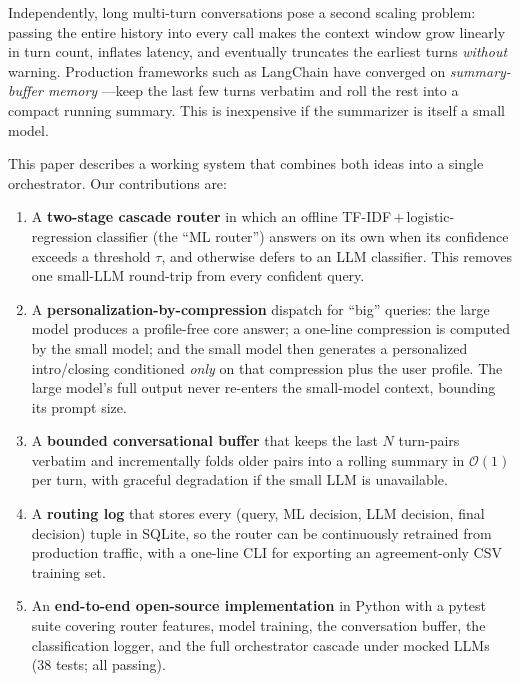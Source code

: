 \documentclass{article}
\begin{document}
Independently, long multi-turn conversations pose a second scaling problem:
passing the entire history into every call makes the context window grow
linearly in turn count, inflates latency, and eventually truncates the
earliest turns \emph{without} warning. Production frameworks such as
LangChain have converged on \emph{summary-buffer memory}
\citep{langchain_memory_2023}---keep the last few turns verbatim and roll the
rest into a compact running summary. This is inexpensive if the summarizer is
itself a small model.

This paper describes a working system that combines both ideas into a single
orchestrator. Our contributions are:

\begin{enumerate}
    \item A \textbf{two-stage cascade router} in which an offline
    TF-IDF\,$+$\,logistic-regression classifier (the ``ML router'') answers on
    its own when its confidence exceeds a threshold $\tau$, and otherwise
    defers to an LLM classifier. This removes one small-LLM round-trip from
    every confident query.
    \item A \textbf{personalization-by-compression} dispatch for ``big'' queries:
    the large model produces a profile-free core answer; a one-line
    compression is computed by the small model; and the small model then
    generates a personalized intro/closing conditioned \emph{only} on that
    compression plus the user profile. The large model's full output never
    re-enters the small-model context, bounding its prompt size.
    \item A \textbf{bounded conversational buffer} that keeps the last $N$
    turn-pairs verbatim and incrementally folds older pairs into a rolling
    summary in $\mathcal{O}(1)$ per turn, with graceful degradation if the
    small LLM is unavailable.
    \item A \textbf{routing log} that stores every (query, ML decision,
    LLM decision, final decision) tuple in SQLite, so the router can be
    continuously retrained from production traffic, with a one-line CLI for
    exporting an agreement-only CSV training set.
    \item An \textbf{end-to-end open-source implementation} in Python with a
    pytest suite covering router features, model training, the conversation
    buffer, the classification logger, and the full orchestrator cascade
    under mocked LLMs (38 tests; all passing).
\end{enumerate}
\end{document}
